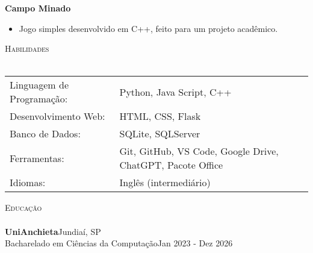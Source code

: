 \documentclass[a4paper]{article}
\newcommand{\lineunder}{
    \vspace*{-8pt} \\
    \hspace*{-18pt} \hrulefill \\
}
\newcommand{\header}[1]{
    {\hspace*{-18pt}\vspace*{6pt} \textsc{#1}}
    \vspace*{-6pt} \lineunder
}
\begin{document}
    \textbf{Campo Minado}\\
    \vspace{-3mm}
    \begin{itemize} \itemsep -3pt
        \item Jogo simples desenvolvido em C++, feito para um projeto acadêmico.
    \end{itemize}

    \header{Habilidades}
    \vspace{2mm}
    \begin{longtable}{p{5cm}p{12cm}}
        Linguagem de Programação: & Python, Java Script, C++\\
        Desenvolvimento Web: & HTML, CSS, Flask \\
        Banco de Dados: & SQLite, SQLServer \\
        Ferramentas: & Git, GitHub, VS Code, Google Drive, ChatGPT, Pacote Office \\
        Idiomas: & Inglês (intermediário)
    \end{longtable}

    \header{Educação}
    \vspace{2mm}
    \textbf{UniAnchieta}\hfill Jundiaí, SP\\
    Bacharelado em Ciências da Computação\hfill Jan 2023 - Dez 2026\\
    
    
    \vspace{1mm}
\end{document}
